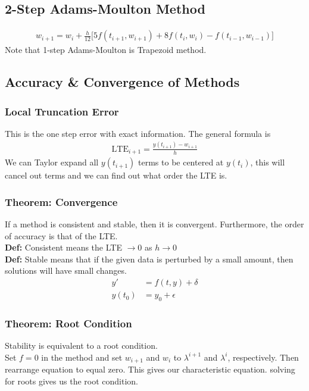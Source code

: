 \documentclass[12pt, letterpaper]{article}
\begin{document}
\subsection{2-Step Adams-Moulton Method}
\begin{align*}
    w_{i+1} = w_i + \frac h{12} \big[ 5f(t_{i+1},w_{i+1})+8f(t_i,w_i)-f(t_{i-1},w_{i-1}) \big]
\end{align*}
Note that 1-step Adams-Moulton is Trapezoid method.

\subsection{Accuracy \& Convergence of Methods}
\subsubsection{Local Truncation Error}
This is the one step error with exact information. The general formula is
\begin{align*}
    \text{LTE}_{i+1} = \frac{y(t_{i+1})-w_{i+1}}{h}
\end{align*}
We can Taylor expand all $y(t_{i+1})$ terms to be centered at $y(t_i)$, this will cancel out terms and we can find out what order the LTE is.

\subsubsection{Theorem: Convergence}
If a method is consistent and stable, then it is convergent. Furthermore, the order of accuracy is that of the LTE. \\

\noindent \textbf{Def:} Consistent means the LTE $\rightarrow 0$ as $h \rightarrow 0$ \\
\noindent \textbf{Def:} Stable means that if the given data is perturbed by a small amount, then solutions will have small changes.
\begin{align*}
    y' &= f(t,y) + \delta \\
    y(t_0) &= y_0 + \epsilon
\end{align*}

\subsubsection{Theorem: Root Condition}
Stability is equivalent to a root condition.\\

\noindent Set $f = 0$ in the method and set $w_{i+1}$ and $w_i$ to $\lambda^{i+1}$ and $\lambda^{i}$, respectively. Then rearrange equation to equal zero.
This gives our characteristic equation. solving for roots gives us the root condition. \\
\end{document}
